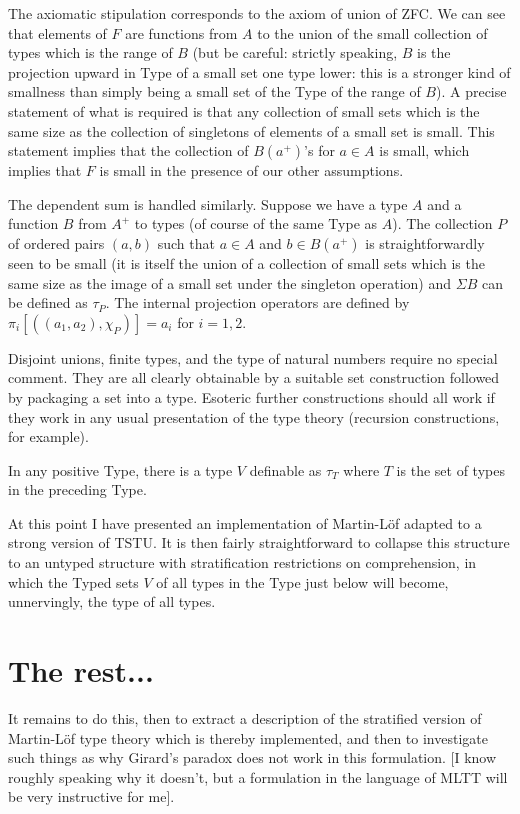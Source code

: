 \documentclass[12pt]{article}
\begin{document}
The axiomatic stipulation corresponds to the axiom of union of ZFC.  We can see that elements of $F$ are functions from $A$ to the union of the small collection of types which is the range of $B$ (but be careful:  strictly speaking, $B$ is the projection upward in Type of a small set one type lower:  this is a stronger kind of smallness than simply being a small set of the Type of the range of $B$).  A precise statement of what is required is that any collection of small sets
which is the same size as the collection of singletons of elements of a small set is small.  This statement implies that
the collection of $B(a^+)$'s for $a \in A$ is small, which implies that $F$ is small in the presence of our other assumptions.

The dependent sum is handled similarly.  Suppose we have a type $A$ and a function $B$ from $A^+$ to types (of course of the same Type as $A$).  The collection $P$ of ordered pairs $(a,b)$ such that $a \in A$
and $b \in B(a^+)$ is straightforwardly seen to be small (it is itself the union of a collection of small sets which is the same size as the image of a small set under the singleton operation) and $\Sigma B$ can be defined as $\tau_P$.  The internal projection operators are defined by $\pi_i[((a_1,a_2),\chi_P)] = a_i$ for $i=1,2$.

Disjoint unions, finite types, and the type of natural numbers require no special comment.  They are all clearly obtainable by a suitable set construction followed by packaging a set into a type.   Esoteric further constructions should all work if they work in any usual presentation of the type theory (recursion constructions, for example).

In any positive Type, there is a type $V$ definable as $\tau_T$ where $T$ is the set of types in the preceding Type.

At this point I have presented an implementation of Martin-L\"of adapted to a strong version of TSTU.  It is then fairly straightforward to collapse this structure to an untyped structure with stratification restrictions on comprehension,
in which the Typed sets $V$ of all types in the Type just below will become, unnervingly, the type of all types.

\section{The rest...}

It remains to do this, then to extract a description of the stratified version of Martin-L\"of type theory which is thereby implemented, and then to investigate such things as why Girard's paradox does not work in this formulation.  [I know roughly speaking why it doesn't, but a formulation in the language of MLTT will be very instructive for me].
\end{document}
